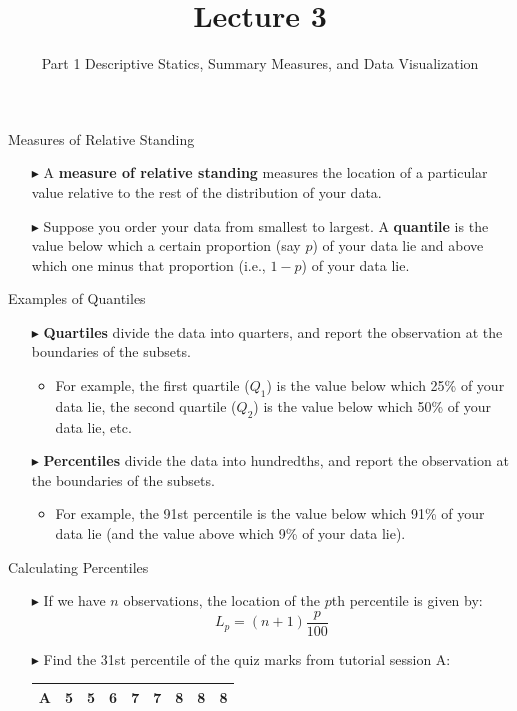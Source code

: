 \documentclass[12pt]{beamer}
\title[ECON2843]{Lecture 3}
\subtitle{Part 1 Descriptive Statics, Summary Measures, and Data Visualization}
\date{}
\begin{document}
	\begin{frame}
		\titlepage
	\end{frame}
\begin{frame}{Measures of Relative Standing}
	\begin{itemize}
		\item[$\blacktriangleright$] A {\bf measure of relative standing} measures the location of a particular value relative to the rest of the distribution of your data.
		\item[$\blacktriangleright$] Suppose you order your data from smallest to largest. A {\bf quantile} is the value below which a certain proportion (say $p$) of your data lie and above which one minus that proportion (i.e., $1-p$) of your data lie.
	\end{itemize}
\end{frame}
\begin{frame}{Examples of Quantiles}
	\begin{itemize}
		\item[$\blacktriangleright$] {\bf Quartiles} divide the data into quarters, and report the observation at the boundaries of the subsets.
		\begin{itemize}
		 \item For example, the first quartile ($Q_1$) is the value below which 25\% of your data lie, the second quartile ($Q_2$) is the value below which 50\% of your data lie, etc.
		 \end{itemize}
		\item[$\blacktriangleright$] {\bf Percentiles} divide the data into hundredths, and report the observation at the boundaries of the subsets.
		\begin{itemize}
			\item For example, the 91st percentile is the value below which 91\% of your data lie (and the value above which 9\% of your data lie).
		\end{itemize}
	\end{itemize}
\end{frame}
\begin{frame}{Calculating Percentiles}
	\begin{itemize}
		\item[$\blacktriangleright$] If we have $n$ observations, the location of the $p$th percentile is given by:
		$$L_p=(n+1)\frac{p}{100}$$
		\item[$\blacktriangleright$] Find the 31st percentile of the quiz marks from tutorial session A:
			\begin{center}
			\begin{tabular}{ccccccccc}
				\hline\hline
				A & 5 & 5 & 6 & 7 & 7 & 8 & 8 & 8\\
				\hline\hline
			\end{tabular}
		\end{center}
	\end{itemize}
\end{frame}
\end{document}
